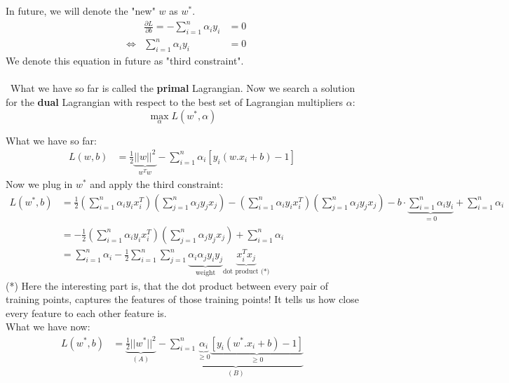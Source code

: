 \documentclass[a4paper]{article}
\begin{document}
        In future, we will denote the "new" $w$ as $w^*$.
        \begin{align}
            & & \frac{\partial L}{\partial b} = - \sum\limits_{i=1}^n \alpha_i y_i &= 0\\
            &\Leftrightarrow & \sum\limits_{i=1}^n \alpha_i y_i &= 0
        \end{align}
        We denote this equation in future as "third constraint".\\\\
        \ 
        What we have so far is called the \textbf{primal} Lagrangian. Now we search a solution for the \textbf{dual} Lagrangian with respect to the best set of Lagrangian multipliers $\alpha$:
        $$\max\limits_{\alpha} L(w^*, \alpha)$$
        
        What we have so far:
        \begin{align}
            L(w,b) &= \frac{1}{2} \underbrace{||w||^2}_{w^T w} - \sum\limits_{i=1}^n \alpha_i [y_i (w.x_i + b) - 1]
        \end{align}
        Now we plug in $w^*$ and apply the third constraint:
        \begin{align}
            L(w^*,b) &= \frac{1}{2} \left( \sum\limits_{i=1}^n \alpha_i y_i x_i^T \right) \left( \sum\limits_{j=1}^n \alpha_j y_j x_j \right)
            - \left( \sum\limits_{i=1}^n \alpha_i y_i x_i^T \right) \left( \sum\limits_{j=1}^n \alpha_j y_j x_j \right) 
            - b \cdot \underbrace{\sum\limits_{i=1}^n \alpha_i y_i}_{= 0} + \sum\limits_{i=1}^n \alpha_i\\
            &= - \frac{1}{2} \left( \sum\limits_{i=1}^n \alpha_i y_i x_i^T \right) \left( \sum\limits_{j=1}^n \alpha_j y_j x_j \right) + \sum\limits_{i=1}^n \alpha_i\\
            &= \sum\limits_{i=1}^n \alpha_i - \frac{1}{2} \sum\limits_{i=1}^n \sum\limits_{j=1}^n \underbrace{\alpha_i \alpha_j y_i y_j}_{\text{weight}} \underbrace{x_i^T x_j}_{\text{dot product (*)}}
        \end{align}
        (*) Here the interesting part is, that the dot product between every pair of training points, captures the features of those training points!
        It tells us how close every feature to each other feature is.\\
        What we have now:
        \begin{align}
            L(w^*,b) &= \underbrace{\frac{1}{2} ||w^*||^2}_{(A)} - \underbrace{\sum\limits_{i=1}^n \underbrace{\alpha_i}_{\geq 0} \underbrace{[y_i (w^*.x_i + b) - 1]}_{\geq 0}}_{(B)}
        \end{align}
\end{document}
